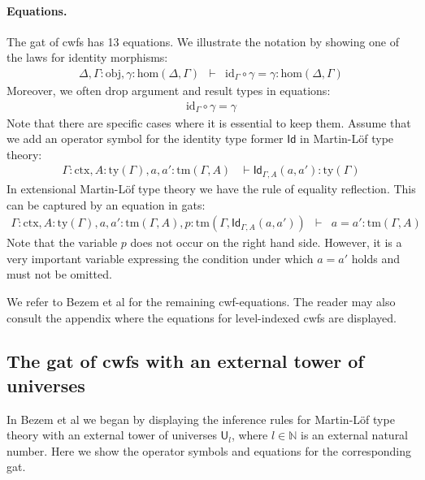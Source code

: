\documentclass[11pt,a4paper]{article}
\theoremstyle{plain}
\theoremstyle{definition}
\newcommand{\Id}{\mathsf{Id}}
\newcommand{\id}{\mathsf{id}}
\newcommand{\UU}{\mathsf{U}}
\def\Nbb{\mathbb{N}}
\def\UU{\mathsf{U}}
\def\Obj{\mathrm{obj}}
\def\sub{\mathrm{hom}}
\def\id{\mathrm{id}}
\newcommand{\ctx}{\mathrm{ctx}}
\newcommand{\ty}{\mathrm{ty}}
\newcommand{\tm}{\mathrm{tm}}
\begin{document}
\paragraph{Equations.}
The gat of cwfs has 13 equations. We illustrate the notation by showing one of the laws for identity morphisms:
\begin{eqnarray*}
\Delta, \Gamma : \Obj, \gamma : \sub(\Delta,\Gamma) &\vdash& \id_\Gamma \circ \gamma = \gamma : \sub(\Delta,\Gamma)
\end{eqnarray*}
Moreover, we often drop argument and result types in equations:
\begin{eqnarray*}
\id_\Gamma \circ \gamma = \gamma
\end{eqnarray*}
Note that there are specific cases where it is essential to keep them. Assume that we add an operator symbol for the identity type former $\Id$ in Martin-Löf type theory:
\begin{eqnarray*}
\Gamma : \ctx, A : \ty(\Gamma), a, a' : \tm(\Gamma, A) &\vdash \Id_{\Gamma,A}(a,a'): \ty(\Gamma)
\end{eqnarray*}
In extensional Martin-Löf type theory \cite{martinlof:hannover} we have the rule of equality reflection. This can be captured by an equation in gats:
\begin{eqnarray*}
\Gamma : \ctx, A : \ty(\Gamma), a, a' : \tm(\Gamma, A),p :  \tm(\Gamma,\Id_{\Gamma,A}(a,a'))&\vdash& a = a' : \tm(\Gamma,A)
\end{eqnarray*}
Note that the variable $p$ does not occur on the right hand side.
However, it is a very important variable expressing
the condition under which $a=a'$ holds and must not be omitted.

We refer to Bezem et al \cite{bezem:hofmann} for the remaining cwf-equations. The reader may also consult the appendix where the equations for level-indexed cwfs are displayed.


\subsection{The gat of cwfs with an external tower of universes}
In Bezem et al \cite{BezemCDE22} we began by displaying the inference rules for Martin-Löf type theory with an external tower of universes $\UU_l$, where $l \in \Nbb$ is an external natural number. Here we show the operator symbols and equations for the corresponding gat.
\end{document}
